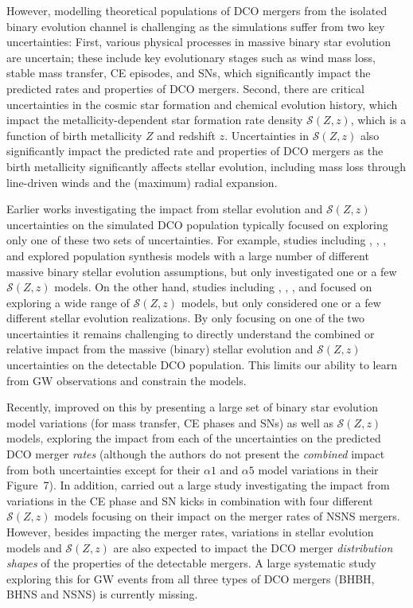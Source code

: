 \documentclass[fleqn,usenatbib]{mnras}
\newcommand{\Zi}{\ensuremath{Z}\xspace}
\newcommand{\SFRD}{\ensuremath{\mathcal{S}(Z,z)}\xspace}
\begin{document}
However, modelling theoretical populations of \ac{DCO} mergers from the isolated binary evolution channel is challenging as the simulations suffer from two key  uncertainties:  First, various physical processes in massive binary star evolution are uncertain; these include key evolutionary stages such as wind mass loss, stable mass transfer, \ac{CE} episodes, and \acp{SN}, which significantly impact the predicted rates and properties of \ac{DCO} mergers.  
Second, there are critical uncertainties in the cosmic star formation and chemical evolution history, which impact the metallicity-dependent star formation rate density \SFRD, which is a function of birth metallicity \Zi and redshift $z$. 
Uncertainties in \SFRD also significantly impact the predicted rate and properties of \ac{DCO} mergers as the birth metallicity significantly affects stellar evolution, including mass loss through line-driven winds and the (maximum) radial expansion. 


Earlier works investigating the impact from stellar evolution and \SFRD uncertainties on the simulated \ac{DCO} population typically focused on exploring only one of these two sets of uncertainties.  
For example, studies including \citet{Dominik:2015}, \citet{GiacobboMapelli:2018}, \citet{Kruckow:2018}, and \citet{Belczynski:2020bigBHpaper} explored population synthesis models with a large number of different massive binary stellar evolution assumptions, but only investigated one or a few \SFRD models. 
On the other hand, studies including \citet{Chruslinska:2019dco}, \citet{Neijssel:2019}, \citet{Tang:2020}, and \citet{Briel:2021} focused on exploring a wide range of \SFRD models, but only considered one or a few different stellar evolution realizations. 
By only focusing on one of the two uncertainties it remains challenging to directly understand the combined or relative impact from the massive (binary) stellar evolution and \SFRD uncertainties on the detectable \ac{DCO} population. 
This limits our ability to learn from \ac{GW} observations and constrain the models.


Recently, \citet{Santoliquido:2021} improved on this by presenting a large set of  binary star evolution model variations (for mass transfer, \ac{CE} phases and \acp{SN}) as well as \SFRD models, exploring the impact from each of the uncertainties on the predicted \ac{DCO} merger \emph{rates} (although the authors do not present the \emph{combined} impact from both uncertainties except for their $\alpha1$ and  $\alpha5$ model variations in their Figure~7). 
In addition, \citet{Chu:2021} carried out a large study investigating the impact from variations in the \ac{CE} phase and \ac{SN} kicks in combination with four different \SFRD models focusing on their impact on the merger rates of \ac{NSNS} mergers. 
However, besides impacting the merger rates, variations in stellar evolution models and \SFRD are also expected to impact the \ac{DCO} merger \emph{distribution shapes} of the properties of the detectable mergers. 
A large systematic study exploring this for \ac{GW} events from all three types of \ac{DCO} mergers (\ac{BHBH}, \ac{BHNS} and \ac{NSNS}) is currently missing. 
\end{document}
